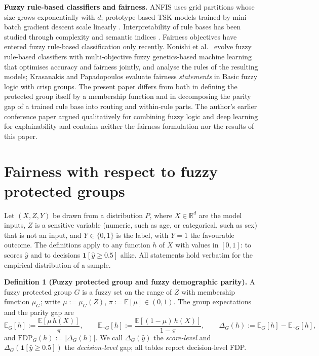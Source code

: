 \documentclass[pdflatex,sn-basic,Numbered,lineno]{sn-jnl}
\begin{document}
\textbf{Fuzzy rule-based classifiers and fairness.} ANFIS \cite{anfis} uses grid partitions whose size grows exponentially with \(d\); prototype-based TSK models trained by mini-batch gradient descent scale linearly \cite{mbgd,htsk,zhou,talpur}. Interpretability of rule bases has been studied through complexity and semantic indices \cite{gacto2011,guillaume,gacto2010,alonso}. Fairness objectives have entered fuzzy rule-based classification only recently. Konishi et al.~\cite{konishi} evolve fuzzy rule-based classifiers with multi-objective fuzzy genetics-based machine learning that optimises accuracy and fairness jointly, and analyse the rules of the resulting models; Krasanakis and Papadopoulos \cite{krasanakis} evaluate fairness \emph{statements} in Basic fuzzy logic with crisp groups. The present paper differs from both in defining the protected group itself by a membership function and in decomposing the parity gap of a trained rule base into routing and within-rule parts. The author's earlier conference paper \cite{imam} argued qualitatively for combining fuzzy logic and deep learning for explainability and contains neither the fairness formulation nor the results of this paper.

\hypertarget{fairness-with-respect-to-fuzzy-protected-groups}{%
\section{Fairness with respect to fuzzy protected groups}\label{fairness-with-respect-to-fuzzy-protected-groups}}

Let \((X,Z,Y)\) be drawn from a distribution \(P\), where \(X \in \mathbb{R}^{d}\) are the model inputs, \(Z\) is a sensitive variable (numeric, such as age, or categorical, such as sex) that is not an input, and \(Y \in \{0,1\}\) is the label, with \(Y = 1\) the favourable outcome. The definitions apply to any function \(h\) of \(X\) with values in \([0,1]\): to scores \(\hat y\) and to decisions \(\mathbf{1}[\hat{y} \geq 0.5]\) alike. All statements hold verbatim for the empirical distribution of a sample.

\textbf{Definition 1 (Fuzzy protected group and fuzzy demographic parity).} A fuzzy protected group \(G\) is a fuzzy set on the range of \(Z\) with membership function \(\mu_G\); write \(\mu := \mu_G(Z)\), \(\pi := \mathbb{E}[\mu] \in (0,1)\). The group expectations and the parity gap are \[\mathbb{E}_{G}[h] := \frac{\mathbb{E}[\mu\, h(X)]}{\pi},\qquad \mathbb{E}_{\neg G}[h] := \frac{\mathbb{E}[(1 - \mu)\, h(X)]}{1 - \pi},\qquad \Delta_{G}(h) := \mathbb{E}_{G}[h] - \mathbb{E}_{\neg G}[h], \tag{1}\] and \(\mathrm{FDP}_{G}(h) := |\Delta_{G}(h)|\). We call \(\Delta_G(\hat y)\) the \emph{score-level} and \(\Delta_G(\mathbf{1}[\hat{y} \geq 0.5])\) the \emph{decision-level} gap; all tables report decision-level FDP.
\end{document}
